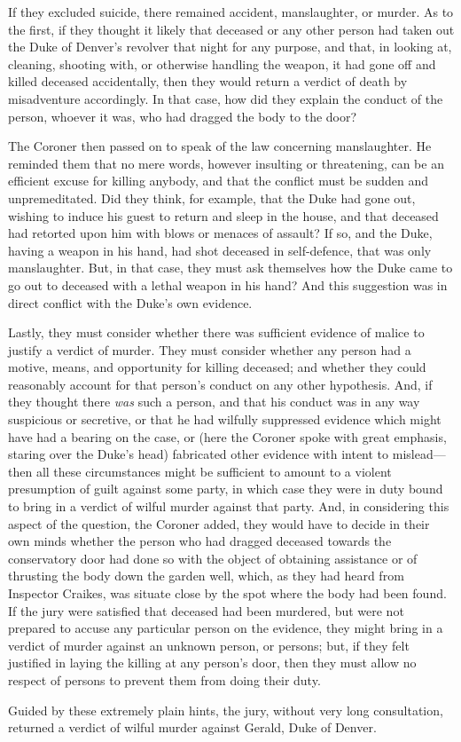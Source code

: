 If they excluded suicide, there remained accident, manslaughter, or murder. As to the first, if they thought it likely that deceased or any other person had taken out the Duke of Denver's revolver that night for any purpose, and that, in looking at, cleaning, shooting with, or otherwise handling the weapon, it had gone off and killed deceased accidentally, then they would return a verdict of death by misadventure accordingly. In that case, how did they explain the conduct of the person, whoever it was, who had dragged the body to the door?

The Coroner then passed on to speak of the law concerning manslaughter.  He reminded them that no mere words, however insulting or threatening, can be an efficient excuse for killing anybody, and that the conflict must be sudden and unpremeditated. Did they think, for example, that the Duke had gone out, wishing to induce his guest to return and sleep in the house, and that deceased had retorted upon him with blows or menaces of assault? If so, and the Duke, having a weapon in his hand, had shot deceased in self-defence, that was only manslaughter. But, in that case, they must ask themselves how the Duke came to go out to deceased with a lethal weapon in his hand? And this suggestion was in direct conflict with the Duke's own evidence.

Lastly, they must consider whether there was sufficient evidence of malice to justify a verdict of murder. They must consider whether any person had a motive, means, and opportunity for killing deceased; and whether they could reasonably account for that person's conduct on any other hypothesis. And, if they thought there \textit{was} such a person, and that his conduct was in any way suspicious or secretive, or that he had wilfully suppressed evidence which might have had a bearing on the case, or (here the Coroner spoke with great emphasis, staring over the Duke's head) fabricated other evidence with intent to mislead\allowbreak---\allowbreak then all these circumstances might be sufficient to amount to a violent presumption of guilt against some party, in which case they were in duty bound to bring in a verdict of wilful murder against that party.  And, in considering this aspect of the question, the Coroner added, they would have to decide in their own minds whether the person who had dragged deceased towards the conservatory door had done so with the object of obtaining assistance or of thrusting the body down the garden well, which, as they had heard from Inspector Craikes, was situate close by the spot where the body had been found. If the jury were satisfied that deceased had been murdered, but were not prepared to accuse any particular person on the evidence, they might bring in a verdict of murder against an unknown person, or persons; but, if they felt justified in laying the killing at any person's door, then they must allow no respect of persons to prevent them from doing their duty.

Guided by these extremely plain hints, the jury, without very long consultation, returned a verdict of wilful murder against Gerald, Duke of Denver.
